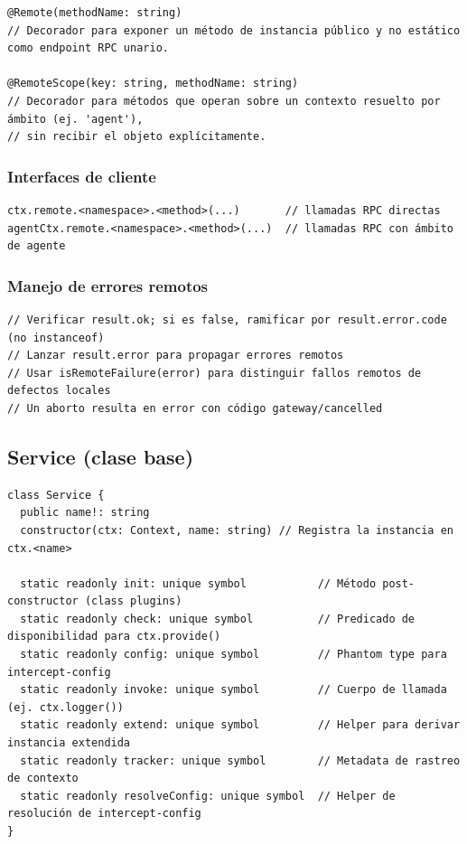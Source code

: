 \documentclass[11pt,a4paper]{article}
\begin{document}
\begin{lstlisting}
@Remote(methodName: string)
// Decorador para exponer un método de instancia público y no estático como endpoint RPC unario.

@RemoteScope(key: string, methodName: string)
// Decorador para métodos que operan sobre un contexto resuelto por ámbito (ej. 'agent'),
// sin recibir el objeto explícitamente.
\end{lstlisting}


\subsubsection*{Interfaces de cliente}


\begin{lstlisting}
ctx.remote.<namespace>.<method>(...)       // llamadas RPC directas
agentCtx.remote.<namespace>.<method>(...)  // llamadas RPC con ámbito de agente
\end{lstlisting}


\subsubsection*{Manejo de errores remotos}


\begin{lstlisting}
// Verificar result.ok; si es false, ramificar por result.error.code (no instanceof)
// Lanzar result.error para propagar errores remotos
// Usar isRemoteFailure(error) para distinguir fallos remotos de defectos locales
// Un aborto resulta en error con código gateway/cancelled
\end{lstlisting}


\subsection*{Service (clase base)}


\begin{lstlisting}
class Service {
  public name!: string
  constructor(ctx: Context, name: string) // Registra la instancia en ctx.<name>

  static readonly init: unique symbol           // Método post-constructor (class plugins)
  static readonly check: unique symbol          // Predicado de disponibilidad para ctx.provide()
  static readonly config: unique symbol         // Phantom type para intercept-config
  static readonly invoke: unique symbol         // Cuerpo de llamada (ej. ctx.logger())
  static readonly extend: unique symbol         // Helper para derivar instancia extendida
  static readonly tracker: unique symbol        // Metadata de rastreo de contexto
  static readonly resolveConfig: unique symbol  // Helper de resolución de intercept-config
}
\end{lstlisting}
\end{document}

